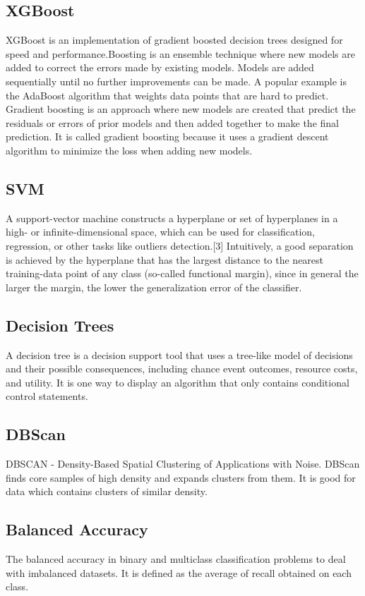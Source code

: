 \documentclass[10pt]{article}
\begin{document}
\subsection{XGBoost}
XGBoost is an implementation of gradient boosted decision trees designed
for speed and performance.Boosting is an ensemble technique where new
models are added to correct the errors made by existing models. Models are
added sequentially until no further improvements can be made. A popular
example is the AdaBoost algorithm that weights data points that are hard
to predict. Gradient boosting is an approach where new models are created
that predict the residuals or errors of prior models and then added
together to make the final prediction. It is called gradient boosting
because it uses a gradient descent algorithm to minimize the loss when
adding new models.\par
\subsection{SVM}
A support-vector machine constructs a hyperplane or set of hyperplanes in a
high- or infinite-dimensional space, which can be used for classification,
regression, or other tasks like outliers detection.[3] Intuitively, a good
separation is achieved by the hyperplane that has the largest distance to
the nearest training-data point of any class (so-called functional margin),
since in general the larger the margin, the lower the generalization error
of the classifier.\par
\subsection{Decision Trees}
A decision tree is a decision support tool that uses a tree-like model of
decisions and their possible consequences, including chance event outcomes,
resource costs, and utility. It is one way to display an algorithm that
only contains conditional control statements.\par
\subsection{DBScan}
DBSCAN - Density-Based Spatial Clustering of Applications with Noise.
DBScan finds core samples of high density and expands clusters from them.
It is good for data which contains clusters of similar density.
\subsection{Balanced Accuracy}
The balanced accuracy in binary and multiclass classification problems to
deal with imbalanced datasets. It is defined as the average of recall
obtained on each class.
\end{document}
